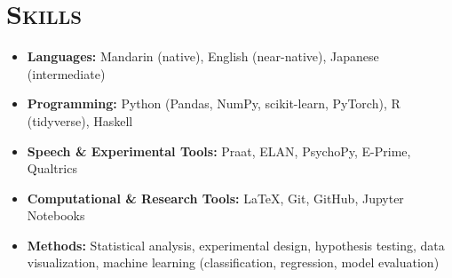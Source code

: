 \documentclass[a4paper,11pt]{article}
\newcommand{\cvsection}[1]{\section*{\Large \textsc{#1}}\vspace{-1em}}
\begin{document}
\cvsection{Skills}
\begin{itemize}[itemsep=0.3em]
    \item \textbf{Languages:} Mandarin (native), English (near-native), Japanese (intermediate)
    
    \item \textbf{Programming:} Python (Pandas, NumPy, scikit-learn, PyTorch), R (tidyverse), Haskell
    
    \item \textbf{Speech \& Experimental Tools:} Praat, ELAN, PsychoPy, E-Prime, Qualtrics
    
    \item \textbf{Computational \& Research Tools:} \LaTeX, Git, GitHub, Jupyter Notebooks
    
    \item \textbf{Methods:} Statistical analysis, experimental design, hypothesis testing, data visualization, machine learning (classification, regression, model evaluation)
\end{itemize}
\end{document}
